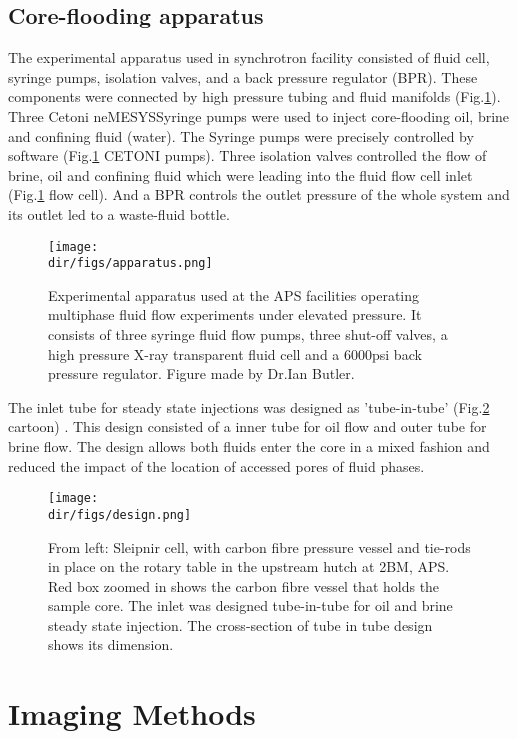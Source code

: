 \subsection{Core-flooding apparatus}
The experimental apparatus used in synchrotron facility consisted of fluid cell, syringe pumps, isolation valves, and a back pressure regulator (BPR). These components were connected by high pressure tubing and fluid manifolds (Fig.\ref{apparatus}). Three Cetoni neMESYS\texttrademark Syringe pumps were used to inject core-flooding oil, brine and confining fluid (water). The Syringe pumps were precisely controlled by software (Fig.\ref{apparatus} CETONI pumps). Three isolation valves controlled the flow of brine, oil and confining fluid which were leading into the fluid flow cell inlet (Fig.\ref{apparatus} flow cell). And a BPR controls the outlet pressure of the whole system and its outlet led to a waste-fluid bottle. 

\begin{figure}[htbp]
  \centering
  \texttt{[image: \\dir/figs/apparatus.png]}
  \caption{ Experimental apparatus used at the APS facilities operating multiphase fluid flow experiments under elevated pressure. It consists of three syringe fluid flow pumps, three shut-off valves, a high pressure X-ray transparent fluid cell and a 6000psi back pressure regulator. Figure made by Dr.Ian Butler.}
  \label{apparatus}
\end{figure}

The inlet tube for steady state injections was designed as 'tube-in-tube' (Fig.\ref{design} cartoon) . This design consisted of a inner tube for oil flow and outer tube for brine flow. The design allows both fluids enter the core in a mixed fashion and reduced the impact of the location of accessed pores of fluid phases.

\begin{figure}[htbp]
  \centering
  \texttt{[image: \\dir/figs/design.png]}
  \caption{From left: Sleipnir cell, with carbon fibre pressure vessel and tie-rods in place on the rotary table in the upstream hutch at 2BM, APS. Red box zoomed in shows the carbon fibre vessel that holds the sample core. The inlet was designed tube-in-tube for oil and brine steady state injection. The cross-section of tube in tube design shows its dimension.}
  \label{design}
\end{figure}

\section{Imaging Methods}
